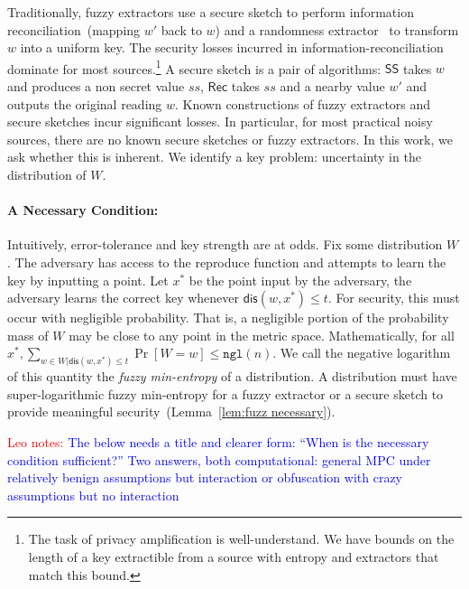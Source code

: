\documentclass[11pt]{article}
\newcommand{\lemref}[1]{\mbox{Lemma~\ref{#1}}}
\newcommand{\class}[1]{{\ensuremath{\mathsf{#1}}}}
\newcommand{\sketch}{\ensuremath{\class{SS}}\xspace}
\newcommand{\rec}{\ensuremath{\class{Rec}}\xspace}
\newcommand{\dis}{\ensuremath{\mathsf{dis}}}
\newcommand{\ngl}{\ensuremath{\mathtt{ngl}}\xspace}
\newcommand{\authnote}[2]{{\textcolor{red}{\textsf{#1 notes: }\textcolor{blue}{ #2}}\marginpar{\textcolor{red}{\textbf{!!!!!}}}}}
\newcommand{\authnote}[2]{}
\newcommand{\lnote}[1]{{\authnote{Leo}{#1}}}
\begin{document}
Traditionally, fuzzy extractors use a secure sketch to perform information reconciliation~(mapping $w'$ back to $w$) and a randomness extractor~\cite{nisan1993randomness} to transform $w$ into a uniform key.  The security losses incurred in information-reconciliation dominate for most sources.\footnote{The task of privacy amplification is well-understand.  We have bounds on the length of a key extractible from a source with entropy and extractors that match this bound.}  A secure sketch is a pair of algorithms: $\sketch$ takes $w$ and produces a non secret value $ss$, $\rec$ takes $ss$ and a nearby value $w'$ and outputs the original reading $w$.  
Known constructions of fuzzy extractors and secure sketches incur significant losses.  In particular, for most practical noisy sources, there are no known secure sketches or fuzzy extractors.  In this work, we ask whether this is inherent.  We identify a key problem: uncertainty in the distribution of $W$.

\paragraph{A Necessary Condition:}  Intuitively, error-tolerance and key strength are at odds.  Fix some distribution $W$.  The adversary has access to the reproduce function and attempts to learn the key by inputting a point.  Let $x^*$ be the point input by the adversary, the adversary learns the correct key whenever $\dis(w, x^*)\le t$.  For security, this must occur with negligible probability.  That is, a negligible portion of the probability mass of $W$ may be close to any point in the metric space.  Mathematically, for all $x^*, \sum_{w\in W | \dis(w, x^*)\le t} \Pr[ W= w] \le \ngl(n)$.  We call the negative logarithm of this quantity the \emph{fuzzy min-entropy} of a distribution.  A distribution must have super-logarithmic fuzzy min-entropy for a fuzzy extractor or a secure sketch  to provide meaningful security~(\lemref{lem:fuzz necessary}).  

\lnote{The below needs a title and clearer form: ``When is the necessary condition sufficient?'' Two answers, both computational: general MPC under relatively benign assumptions but interaction or obfuscation with crazy assumptions but no interaction}
\end{document}
